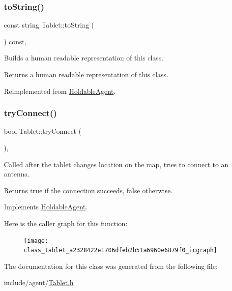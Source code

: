 \subsubsection{\texorpdfstring{to\+String()}{toString()}}
{\footnotesize\ttfamily const string Tablet\+::to\+String (\begin{DoxyParamCaption}{ }\end{DoxyParamCaption}) const\hspace{0.3cm}{\ttfamily [override]}, {\ttfamily [virtual]}}

Builds a human readable representation of this class. \begin{DoxyReturn}{Returns}
a human readable representation of this class. 
\end{DoxyReturn}


Reimplemented from \hyperlink{class_holdable_agent_a2c581226b8994f24b6b2306ae17dbb52}{Holdable\+Agent}.

\mbox{\label{class_tablet_a2328422e1706dfeb2b51a6960e6879f0}} 
\subsubsection{\texorpdfstring{try\+Connect()}{tryConnect()}}
{\footnotesize\ttfamily bool Tablet\+::try\+Connect (\begin{DoxyParamCaption}{ }\end{DoxyParamCaption})\hspace{0.3cm}{\ttfamily [override]}, {\ttfamily [virtual]}}

Called after the tablet changes location on the map, tries to connect to an antenna. \begin{DoxyReturn}{Returns}
true if the connection succeeds, false otherwise. 
\end{DoxyReturn}


Implements \hyperlink{class_holdable_agent_a0789d757d81b43ee016e9362046f6dea}{Holdable\+Agent}.

Here is the caller graph for this function\+:
\nopagebreak
\begin{figure}[H]
\begin{center}
\leavevmode
\texttt{[image: class\_tablet\_a2328422e1706dfeb2b51a6960e6879f0\_icgraph]}
\end{center}
\end{figure}


The documentation for this class was generated from the following file\+:\begin{DoxyCompactItemize}
\item 
include/agent/\hyperlink{_tablet_8h}{Tablet.\+h}\end{DoxyCompactItemize}
